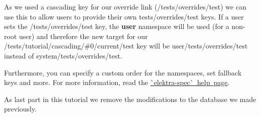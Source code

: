 As we used a cascading key for our override link ({\ttfamily /tests/overrides/test}) we can use this to allow users to provide their own {\ttfamily tests/overrides/test} keys. If a user sets the {\ttfamily /tests/overrides/test} key, the {\bfseries{user}} namespace will be used (for a non-\/root user) and therefore the new target for our {\ttfamily /tests/tutorial/cascading/\#0/current/test} key will be {\ttfamily user/tests/overrides/test} instead of {\ttfamily system/tests/overrides/test}.


\begin{DoxyCode}{0}
\end{DoxyCode}


Furthermore, you can specify a custom order for the namespaces, set fallback keys and more. For more information, read the \mbox{\hyperlink{doc_help_elektra-spec_md}{\`{}elektra-\/spec\`{} help page}}.

As last part in this tutorial we remove the modifications to the database we made previously.


\begin{DoxyCode}{0}
\DoxyCodeLine{}
\DoxyCodeLine{}
\end{DoxyCode}
 